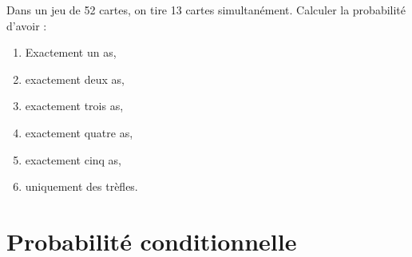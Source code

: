             \begin{exe}\label{exe:proba-cours-5}
                        Dans un jeu de 52 cartes, on tire 13 cartes simultan\'ement.
                        Calculer la probabilit\'e d'avoir : 
                        \begin{enumerate}
                              \item Exactement un as,
                              \item exactement deux as,
                              \item exactement trois as,
                              \item exactement quatre as,
                              \item exactement cinq as,
                              \item uniquement des tr\`efles.
                        \end{enumerate}
            \end{exe}
      \section{Probabilit\'e conditionnelle}
